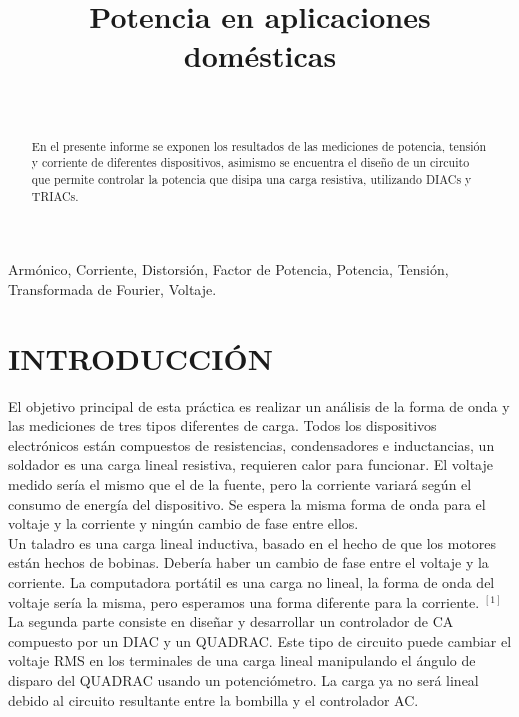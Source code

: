 \documentclass[journal]{IEEEtran}
\title{\textbf{Potencia en aplicaciones domésticas}}
\author{
  \IEEEauthorblockN{ Jorge Lambra\~no$^3$, Julian Rojas$^2$, 
  Juan Sánchez$^3$}\\
  \IEEEauthorblockA{\texttt{\small{$^1$jelambrano, $^2$drojasj, $^3$paradac @uninorte.edu.co
   }}}}
\begin{document}
\maketitle

\begin{abstract}  
En el presente informe se exponen los resultados de las
mediciones de potencia, tensión y corriente de diferentes
dispositivos, asimismo se encuentra el diseño de un 
circuito que permite controlar la potencia que disipa una 
carga resistiva, utilizando DIACs y TRIACs. 
\end{abstract}


\begin{IEEEkeywords}  
Armónico, Corriente, Distorsión, Factor de Potencia,  Potencia, Tensión, Transformada de Fourier, Voltaje. 
\end{IEEEkeywords}

\section{INTRODUCCIÓN}
El objetivo principal de esta práctica es realizar 
un análisis de la forma de onda y las mediciones 
de tres tipos diferentes de carga.
Todos los dispositivos electrónicos están compuestos 
de resistencias, condensadores e inductancias, un 
soldador es una carga lineal resistiva, requieren calor 
para funcionar. El voltaje medido sería el mismo que 
el de la fuente, pero la corriente variará según el 
consumo de energía del dispositivo. Se espera la misma 
forma de onda para el voltaje y la corriente y ningún 
cambio de fase entre ellos.\\

Un taladro es una carga lineal inductiva, basado 
en el hecho de que los motores están hechos de 
bobinas. Debería haber un cambio de fase entre el 
voltaje y la corriente. La computadora portátil 
es una carga no lineal, la forma de onda del voltaje 
sería la misma, pero esperamos una forma diferente 
para la corriente. $^{\left[1\right]}$ \\

La segunda parte consiste en diseñar y desarrollar 
un controlador de CA compuesto por un DIAC y un 
QUADRAC. Este tipo de circuito puede cambiar el 
voltaje RMS en los terminales de una carga lineal 
manipulando el ángulo de disparo del QUADRAC usando 
un potenciómetro. La carga ya no será lineal debido 
al circuito resultante entre la bombilla y el 
controlador AC.
\end{document}

